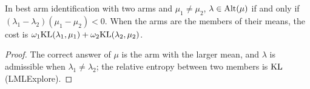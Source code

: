 \begin{lemma}
  \label{lem:alternatives_bai_two}
  \leanok
  In best arm identification with two arms and $\mu_1 \ne \mu_2$, $\lambda \in \mathrm{Alt}(\mu)$ if and only
  if $(\lambda_1 - \lambda_2)(\mu_1 - \mu_2) < 0$. When the arms are the members of their means, the
  cost is $\omega_1 \mathrm{KL}(\lambda_1, \mu_1) + \omega_2 \mathrm{KL}(\lambda_2, \mu_2)$.
\end{lemma}

\begin{proof}
  \leanok
  The correct answer of $\mu$ is the arm with the larger mean, and $\lambda$ is admissible when
  $\lambda_1 \ne \lambda_2$; the relative entropy between two members is $\mathrm{KL}$ (LMLExplore).
\end{proof}
